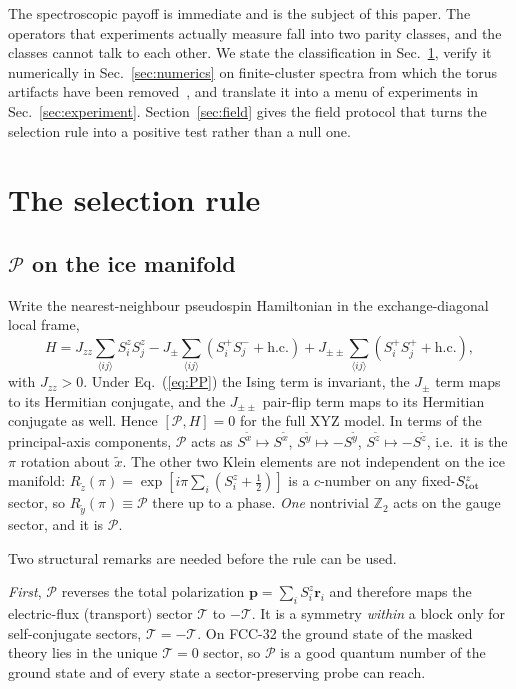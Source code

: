 \documentclass[aps,prl,preprint,amsmath,amssymb,superscriptaddress,
longbibliography,floatfix]{revtex4-2}
\newcommand{\Jzz}{J_{zz}}
\newcommand{\Jpm}{J_{\pm}}
\newcommand{\Jpmpm}{J_{\pm\pm}}
\DeclareRobustCommand{\br}{\bm r}
\newcommand{\PP}{\mathcal{P}}
\begin{document}
The spectroscopic payoff is immediate and is the subject of this paper.  The
operators that experiments actually measure fall into two parity classes, and
the classes cannot talk to each other.  We state the classification in
Sec.~\ref{sec:rule}, verify it numerically in Sec.~\ref{sec:numerics} on
finite-cluster spectra from which the torus artifacts have been
removed~\cite{ZhouKimMask}, and translate it into a menu of experiments in
Sec.~\ref{sec:experiment}.  Section~\ref{sec:field} gives the field protocol
that turns the selection rule into a positive test rather than a null one.

\section{The selection rule}
\label{sec:rule}

\subsection{$\PP$ on the ice manifold}

Write the nearest-neighbour pseudospin Hamiltonian in the exchange-diagonal
local frame,
\begin{equation}
 H=\Jzz\sum_{\langle ij\rangle}S^z_iS^z_j
 -\Jpm\sum_{\langle ij\rangle}\left(S^+_iS^-_j+\mathrm{h.c.}\right)
 +\Jpmpm\sum_{\langle ij\rangle}\left(S^+_iS^+_j+\mathrm{h.c.}\right),
 \label{eq:model}
\end{equation}
with $\Jzz>0$.  Under Eq.~(\ref{eq:PP}) the Ising term is invariant, the
$\Jpm$ term maps to its Hermitian conjugate, and the $\Jpmpm$ pair-flip term
maps to its Hermitian conjugate as well.  Hence $[\PP,H]=0$ for the full XYZ
model.  In terms of the principal-axis components, $\PP$ acts as
$S^{\tilde x}\mapsto S^{\tilde x}$, $S^{\tilde y}\mapsto -S^{\tilde y}$,
$S^{\tilde z}\mapsto -S^{\tilde z}$, i.e.\ it is the $\pi$ rotation about
$\tilde x$.  The other two Klein elements are not independent on the ice
manifold: $R_{\tilde z}(\pi)=\exp[i\pi\sum_i(S^z_i+\tfrac12)]$ is a
$c$-number on any fixed-$S^z_{\rm tot}$ sector, so
$R_{\tilde y}(\pi)\equiv\PP$ there up to a phase.  \emph{One} nontrivial
$\mathbb{Z}_2$ acts on the gauge sector, and it is $\PP$.

Two structural remarks are needed before the rule can be used.

\emph{First}, $\PP$ reverses the total polarization
$\bm p=\sum_iS^z_i\br_i$ and therefore maps the electric-flux (transport)
sector $\mathcal T$ to $-\mathcal T$.  It is a symmetry \emph{within} a block
only for self-conjugate sectors, $\mathcal T=-\mathcal T$.  On FCC-32 the
ground state of the masked theory lies in the unique $\mathcal T=0$ sector, so
$\PP$ is a good quantum number of the ground state and of every state a
sector-preserving probe can reach.
\end{document}
